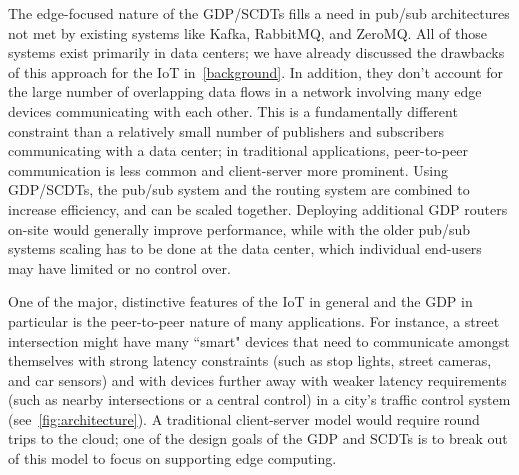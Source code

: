 The edge-focused nature of the GDP/SCDTs fills a need in pub/sub architectures not met by existing systems like Kafka, RabbitMQ, and ZeroMQ. All of those systems exist primarily in data centers; we have already discussed the drawbacks of this approach for the IoT in~\autoref{background}. In addition, they don't account for the large number of overlapping data flows in a network involving many edge devices communicating with each other. This is a fundamentally different constraint than a relatively small number of publishers and subscribers communicating with a data center; in traditional applications, peer-to-peer communication is less common and client-server more prominent. Using GDP/SCDTs, the pub/sub system and the routing system are combined to increase efficiency, and can be scaled together. Deploying additional GDP routers on-site would generally improve performance, while with the older pub/sub systems scaling has to be done at the data center, which individual end-users may have limited or no control over. 

One of the major, distinctive features of the IoT in general and the GDP in particular is the peer-to-peer nature of many applications. For instance, a street intersection might have many ``smart" devices that need to communicate amongst themselves with strong latency constraints (such as stop lights, street cameras, and car sensors) and with devices further away with weaker latency requirements (such as nearby intersections or a central control) in a city's traffic control system (see~\autoref{fig:architecture}). A traditional client-server model would require round trips to the cloud; one of the design goals of the GDP and SCDTs is to break out of this model to focus on supporting edge computing.

